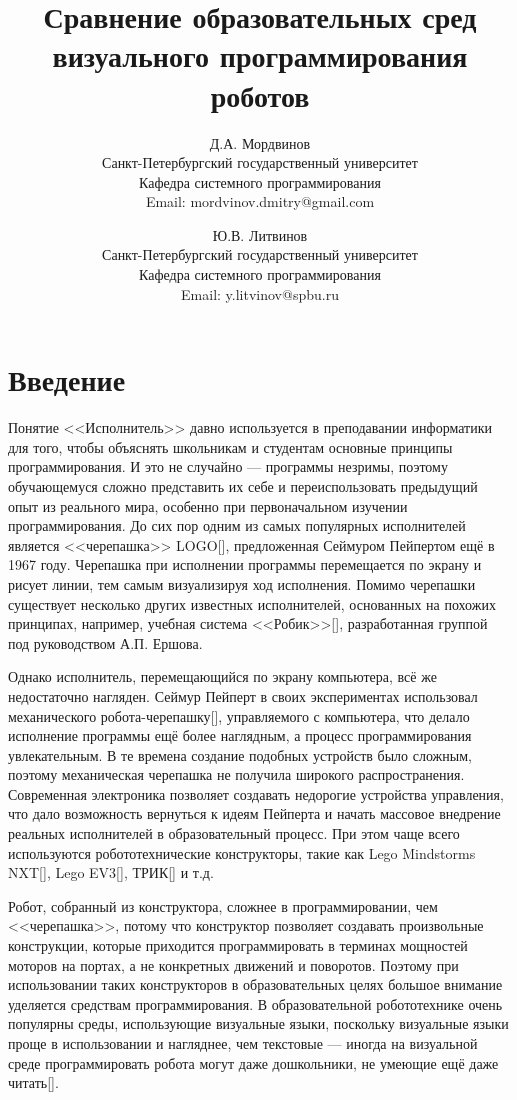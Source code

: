 \documentclass[a5paper]{article}
\title{Сравнение образовательных сред визуального программирования роботов}
\author{
	Д.А. Мордвинов \\
	Санкт-Петербургский государственный университет\\
	Кафедра системного программирования\\
	Email: mordvinov.dmitry@gmail.com
\and
	Ю.В. Литвинов \\
	Санкт-Петербургский государственный университет\\
	Кафедра системного программирования\\
	Email: y.litvinov@spbu.ru
}
\date{}
\begin{document}
\maketitle
\thispagestyle{empty}

\begin{quote}
\small\noindent
\end{quote}

\section*{Введение}
Понятие <<Исполнитель>> давно используется в преподавании информатики для того, чтобы объяснять школьникам и студентам 
основные принципы программирования. И это не случайно --- программы незримы, поэтому обучающемуся сложно представить 
их себе и переиспользовать предыдущий опыт из реального мира, особенно при первоначальном изучении программирования. 
До сих пор одним из самых популярных исполнителей является <<черепашка>> LOGO[], предложенная Сеймуром Пейпертом 
ещё в 1967 году. Черепашка при исполнении программы перемещается по экрану и рисует линии, тем самым визуализируя 
ход исполнения. Помимо черепашки существует несколько других известных исполнителей, основанных на похожих принципах, 
например, учебная система <<Робик>>[], разработанная группой под руководством А.П. Ершова.

Однако исполнитель, перемещающийся по экрану компьютера, всё же недостаточно нагляден. Сеймур Пейперт в своих 
экспериментах использовал механического робота-черепашку[], управляемого с компьютера, что делало исполнение 
программы ещё более наглядным, а процесс программирования увлекательным. В те времена создание подобных устройств 
было сложным, поэтому механическая черепашка не получила широкого распространения. Современная электроника 
позволяет создавать недорогие устройства управления, что дало возможность вернуться к идеям Пейперта и начать 
массовое внедрение реальных исполнителей в образовательный процесс. При этом чаще всего используются робототехнические 
конструкторы, такие как Lego Mindstorms NXT[], Lego EV3[], ТРИК[] и т.д.

Робот, собранный из конструктора, сложнее в программировании, чем <<черепашка>>, потому что конструктор позволяет 
создавать произвольные конструкции, которые приходится программировать в терминах мощностей моторов на портах, 
а не конкретных движений и поворотов. Поэтому при использовании таких конструкторов в образовательных целях 
большое внимание уделяется средствам программирования. В образовательной робототехнике очень популярны 
среды, использующие визуальные языки, поскольку визуальные языки проще в использовании и нагляднее, чем 
текстовые --- иногда на визуальной среде программировать робота могут даже дошкольники, не умеющие ещё 
даже читать[].
\end{document}
